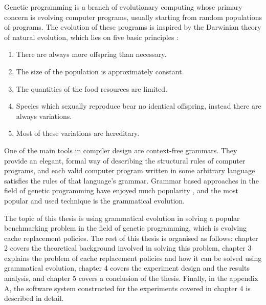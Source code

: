 Genetic programming is a branch of evolutionary computing whose primary concern is evolving computer programs, usually starting from random populations of programs. The evolution of these programs is inspired by the Darwinian theory of natural evolution, which lies on five basic principles \citep{cupic2019evolucijskoracunarstvo}:

\begin{enumerate}
	\item There are always more offspring than necessary.
	\item The size of the population is approximately constant.
	\item The quantities of the food resources are limited.
	\item Species which sexually reproduce bear no identical offspring, instead there are always variations.
	\item Most of these variations are hereditary.
\end{enumerate}

One of the main tools in compiler design are context-free grammars. They provide an elegant, formal way of describing the structural rules of computer programs, and each valid computer program written in some arbitrary language satisfies the rules of that language's grammar. Grammar based approaches in the field of genetic programming have enjoyed much popularity \citep{neill2003grammaticalevolution}, and the most popular and used technique is the grammatical evolution.

The topic of this thesis is using grammatical evolution in solving a popular benchmarking problem in the field of genetic programming, which is evolving cache replacement policies. The rest of this thesis is organised as follows: chapter 2 covers the theoretical background involved in solving this problem, chapter 3 explains the problem of cache replacement policies and how it can be solved using grammatical evolution, chapter 4 covers the experiment design and the results analysis, and chapter 5 covers a conclusion of the thesis. Finally, in the appendix A, the software system constructed for the experiments covered in chapter 4 is described in detail.